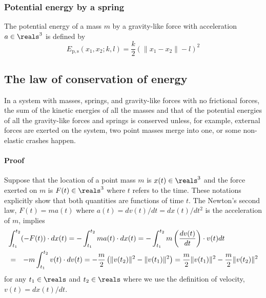\documentclass{article}
\begin{document}
\subsubsection{Potential energy by a spring}

The potential energy of a mass $m$ by a gravity-like force with acceleration $a\in\reals^3$
is defined by
\begin{equation}
\label{eq:energy:potential:spring}
E_\mathrm{p,s}(x_1,x_2;k,l)
= \frac{k}{2} (\|x_1-x_2\|-l)^2
\end{equation}


\subsection{The law of conservation of energy}

In a system with masses, springs, and gravity-like forces with no frictional forces,
the sum of the kinetic energies of all the masses
and that of the potential energies of all the gravity-like forces and springs
is conserved
unless, for example, external forces are exerted on the system,
two point masses merge into one,
or some non-elastic crashes happen.

\paragraph{Proof}
\label{paragraph:proof}

Suppose that the location of a point mass $m$ is $x(t)\in\reals^3$
and the force exerted on $m$ is $F(t)\in\reals^3$ where $t$ refers to the time.
These notations explicitly show that both quantities are functions of time $t$.
The Newton's second law, $F(t) = m a(t)$ where $a(t) = dv(t)/dt = {dx(t)}/{dt^2}$ is the acceleration of $m$,
implies
\begin{eqnarray}
\nonumber
\lefteqn{
\int_{t_1}^{t_2} (-F(t)) \cdot d x(t)
=
	- \int_{t_1}^{t_2} m a(t) \cdot d x(t)
=
	- \int_{t_1}^{t_2} m \left( \frac{dv(t)}{dt} \right) \cdot v(t) dt
}
\\
&=&
	- m \int_{t_1}^{t_2} {v(t)} \cdot dv(t)
=
	- \frac{m}{2}\left(
		\|v(t_2)\|^2 - \|v(t_1)\|^2
	\right)
=
	\frac{m}{2} \|v(t_1)\|^2
	- \frac{m}{2} \|v(t_2)\|^2
\label{eq:energy:conserve:1}
\end{eqnarray}
for any $t_1\in\reals$ and $t_2\in\reals$
where we use the definition of velocity,
$v(t) = {dx(t)}/{dt}$.
\end{document}
